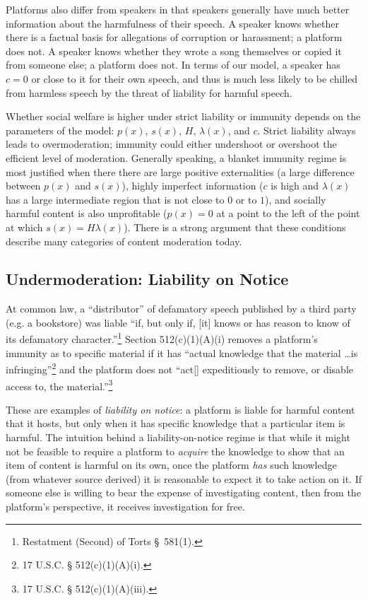 Platforms also differ from speakers in that speakers generally have much better information about the harmfulness of their speech. A speaker knows whether there is a factual basis for allegations of corruption or harassment; a platform does not. A speaker knows whether they wrote a song themselves or copied it from someone else; a platform does not. In terms of our model, a speaker has $c = 0$ or close to it for their own speech, and thus is much less likely to be chilled from harmless speech by the threat of liability for harmful speech.

Whether social welfare is higher under strict liability or immunity depends on the parameters of the model:  $p(x)$, $s(x)$, $H$, $\lambda(x)$, and $c$. Strict liability always leads to overmoderation; immunity could either undershoot or overshoot the efficient level of moderation. Generally speaking, a blanket immunity regime is most justified when there there are large positive externalities (a large difference between $p(x)$ and $s(x)$), highly imperfect information ($c$ is high and $\lambda(x)$ has a large intermediate region that is not close to $0$ or to $1$), and socially harmful content is also unprofitable ($p(x) = 0$ at a point to the left of the point at which $s(x) = H\lambda(x)$). There is a strong argument that these conditions describe many categories of content moderation today.


\subsection{Undermoderation: Liability on Notice}

At common law, a ``distributor'' of defamatory speech published by a third party (e.g. a bookstore) was liable ``if, but only if, [it] knows or has reason to know of its defamatory character.''\footnote{Restatment (Second) of Torts §~581(1).}  Section 512(c)(1)(A)(i) removes a platform's immunity as to specific material if it has ``actual knowledge that the material \ldots is infringing''\footnote{17 U.S.C. § 512(c)(1)(A)(i).} and the platform does not ``act[] expeditiously to remove, or disable access to, the material.''\footnote{17 U.S.C. § 512(c)(1)(A)(iii).} 

These are examples of \emph{liability on notice}: a platform is liable for harmful content that it hosts, but only when it has specific knowledge that a particular item is harmful. The intuition behind a liability-on-notice regime is that while it might not be feasible to require a platform to \emph{acquire} the knowledge to show that an item of content is harmful on its own, once the platform \emph{has} such knowledge (from whatever source derived) it is reasonable to expect it to take action on it. If someone else is willing to bear the expense of investigating content, then from the platform's perspective, it receives investigation for free.


